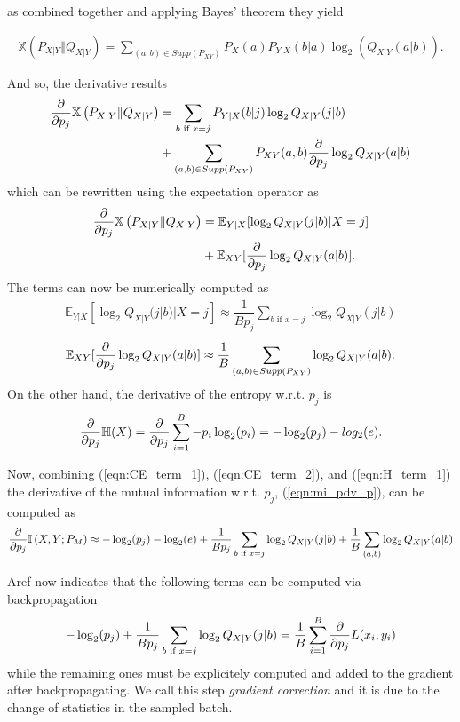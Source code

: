 as combined together and applying Bayes' theorem they yield

\begin{align}
\label{eqn:CE_expanded}
	\mathbb{X}\left(P_{X|Y} \Vert Q_{X|Y}\right) = \sum \limits_{(a,b) \in Supp(P_{XY})} P_X(a) P_{Y|X}(b|a) \log_2(Q_{X|Y}(a|b)). 
\end{align}

And so, the derivative results
\begin{align}
	\pdv{p_j} \mathbb{X}\left(P_{X|Y} \Vert Q_{X|Y}\right) &= \sum \limits_{b \text{ if } x=j} P_{Y|X}(b|j) \log_2 Q_{X|Y}(j|b) \\
	& + \sum \limits_{(a,b) \in Supp(P_{XY})} P_{XY}(a, b) \pdv{p_j} \log_2 Q_{X|Y}(a|b)
\end{align}
which can be rewritten using the expectation operator as
\begin{align}
	\pdv{p_j} \mathbb{X}\left(P_{X|Y} \Vert Q_{X|Y}\right) &= \mathbb{E}_{Y|X}[ \log_2 Q_{X|Y}(j|b)| X=j] \\
	& + \mathbb{E}_{XY}[ \pdv{p_j} \log_2 Q_{X|Y}(a|b)].
\end{align}
The terms can now be numerically computed as
\begin{align}
\label{eqn:CE_term_1}
	\mathbb{E}_{Y|X}[ \log_2 Q_{X|Y}(j|b)| X=j] \approx \dfrac{1}{Bp_j}\sum \limits_{b \text{ if } x=j} \log_2 Q_{X|Y}(j|b)
\end{align}
\begin{align}
\label{eqn:CE_term_2}
	\mathbb{E}_{XY}[ \pdv{p_j} \log_2 Q_{X|Y}(a|b)] \approx \dfrac{1}{B} \sum \limits_{(a,b) \in Supp(P_{XY})} \log_2 Q_{X|Y}(a|b).
\end{align}
On the other hand, the derivative of the entropy w.r.t. $p_j$ is
\begin{align}
\label{eqn:H_term_1}
	\pdv{p_j} \mathbb{H}(X) = \pdv{p_j} \sum \limits_{i = 1}^{B} - p_i \log_2(p_i) = - \log_2 (p_j) - log_2 (e).
\end{align}

Now, combining (\ref{eqn:CE_term_1}), (\ref{eqn:CE_term_2}), and (\ref{eqn:H_term_1}) the derivative of the mutual information w.r.t. $p_j$, (\ref{eqn:mi_pdv_p}), can be computed as
\begin{align}
	\pdv{p_j} \mathbb{I} \left(X , Y ; P_M \right) \approx - \log_2 (p_j) - \log_2 (e) + \dfrac{1}{Bp_j}\sum \limits_{b \text{ if } x=j} \log_2 Q_{X|Y}(j|b) + \dfrac{1}{B} \sum \limits_{(a,b)} \log_2 Q_{X|Y}(a|b)
\end{align}

Aref now indicates that the following terms can be computed via backpropagation
\begin{align}
	- \log_2 (p_j) + \dfrac{1}{Bp_j}\sum \limits_{b \text{ if } x=j} \log_2 Q_{X|Y}(j|b) = \dfrac{1}{B} \sum \limits_{i = 1}^{B} \pdv{p_j} L(x_i, y_i)
\end{align}
while the remaining ones must be explicitely computed and added to the gradient after backpropagating. We call this step \textit{gradient correction} and it is due to the change of statistics in the sampled batch.

